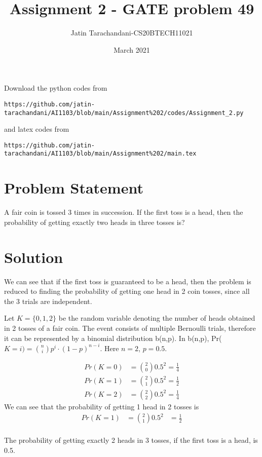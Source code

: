 \documentclass[twocolumn]{article}
\title{Assignment 2 - GATE problem 49}
\author{Jatin Tarachandani-CS20BTECH11021}
\date{March 2021}
\begin{document}
\maketitle
Download the python codes from 
\begin{lstlisting}
https://github.com/jatin-tarachandani/AI1103/blob/main/Assignment%202/codes/Assignment_2.py
\end{lstlisting}
%
and latex codes from 
%
\begin{lstlisting}
https://github.com/jatin-tarachandani/AI1103/blob/main/Assignment%202/main.tex
\end{lstlisting}
\section{Problem Statement}
A fair coin is tossed 3 times in succession. If the first toss is a head, then the probability of getting exactly two heads in three tosses is?
\section{Solution}
We can see that if the first toss is guaranteed to be a head, then the problem is reduced to finding the probability of getting one head in 2 coin tosses, since all the 3 trials are independent.

Let $K=\{0, 1, 2\}$ be the random variable denoting the number of heads obtained in 2 tosses of a fair coin. The event consists of multiple Bernoulli trials, therefore it can be represented by a binomial distribution b(n,p).
In b(n,p), Pr($K=i)= \binom{n}{i}p^i \cdot (1-p)^{n-i}$. Here $n=2$, $p=0.5$.

\begin{align}
    Pr(K=0)&=\binom{2}{0} 0.5^2=\frac{1}{4}\\
    Pr(K=1)&=\binom{2}{1} 0.5^2=\frac{1}{2}\\
    Pr(K=2)&=\binom{2}{2} 0.5^2=\frac{1}{4}
\end{align}
 We can see that the probability of getting 1 head in 2 tosses is 
 \begin{align*}
 Pr(K=1)&=\binom{2}{1} 0.5^2
 &=\frac{1}{2}\\
 \end{align*}
 
The probability of getting exactly 2 heads in 3 tosses, if the first toss is a head, is 0.5.
\end{document}
